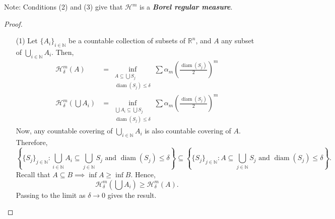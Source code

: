 \documentclass[10pt]{article}
\theoremstyle{plain}
\DeclareMathOperator{\diam}{diam}
\begin{document}
\noindent Note: Conditions (2) and (3) give that $\mathcal{H}^m$ is a \textbf{\textit{Borel regular measure}}. 
	\begin{proof} ~
		\begin{itemize}
			\item[(1)]  Let $\{A_i\}_{i \in \mathbb{N}}$ be a countable collection of subsets of $\mathbb{R}^n$, and $A$ any subset of $\bigcup_{i \in \mathbb{N}} A_i$. Then,
				\begin{align*}
					\mathcal{H}_\delta^m(A) &= \inf_{\substack{A \subseteq \bigcup S_j \\ \diam(S_j) \leq \delta}} \sum  \alpha_m \left(\frac{\diam(S_j)}{2}\right)^m \\
					\mathcal{H}_\delta^m(\bigcup A_i) &= \inf_{\substack{\bigcup A_i\subseteq \bigcup S_j \\ \diam(S_j) \leq \delta}} \sum  \alpha_m \left(\frac{\diam(S_j)}{2}\right)^m  
				\end{align*}
			Now, any countable covering of $\bigcup_{i \in \mathbb{N}} A_i$ is also countable covering of $A$. Therefore, 
				$$\left\{\{S_j\}_{j \in \mathbb{N}} : \bigcup_{i \in \mathbb{N}} A_i \subseteq \bigcup_{j \in \mathbb{N}} S_j \text{ and } \diam(S_j) \leq \delta\right\} \subseteq \left\{\{S_j\}_{j \in \mathbb{N}} :A \subseteq \bigcup_{j \in \mathbb{N}} S_j \text{ and } \diam(S_j) \leq \delta\right\}.$$ Recall that $A \subseteq B \implies \inf A \geq \inf B$. Hence, $$\mathcal{H}_\delta^m\left(\bigcup A_i\right) \geq \mathcal{H}_\delta^m(A).$$ Passing to the limit as $\delta \to 0$ gives the result. 
			

\end{itemize}
\end{proof}
\end{document}
